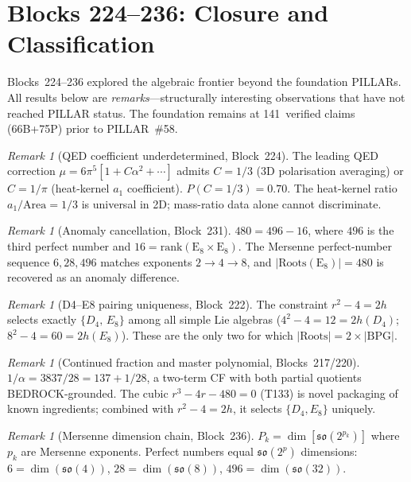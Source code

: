 \documentclass[aps,prd,twocolumn,superscriptaddress,floatfix,nofootinbib]{revtex4-2}
\theoremstyle{definition}
\theoremstyle{remark}
\newtheorem{remark}[theorem]{Remark}
\begin{document}
\section{Blocks 224--236: Closure and Classification}
\label{sec:closure}

Blocks~224--236 explored the algebraic frontier beyond the foundation
PILLARs.  All results below are \emph{remarks}---structurally interesting
observations that have not reached PILLAR status.  The foundation remains
at 141~verified claims (66B+75P) prior to PILLAR~\#58.

\begin{remark}[QED coefficient underdetermined, Block~224]
\label{rem:qed-coeff}
The leading QED correction $\mu = 6\pi^5[1+C\alpha^2+\cdots]$ admits
$C=1/3$ (3D polarisation averaging) or $C=1/\pi$ (heat-kernel $a_1$
coefficient).  $P(C{=}1/3)=0.70$.  The heat-kernel ratio $a_1/\mathrm{Area}=1/3$
is universal in 2D; mass-ratio data alone cannot discriminate.
\end{remark}

\begin{remark}[Anomaly cancellation, Block~231]
\label{rem:anomaly}
$480 = 496 - 16$, where $496$ is the third perfect number and
$16 = \mathrm{rank}(\mathrm{E}_8\times\mathrm{E}_8)$.  The Mersenne
perfect-number sequence $6,28,496$ matches exponents $2\to 4\to 8$,
and $|\mathrm{Roots}(\mathrm{E}_8)|=480$ is recovered as an anomaly difference.
\end{remark}

\begin{remark}[D4--E8 pairing uniqueness, Block~222]
\label{rem:d4e8}
The constraint $r^2-4=2h$ selects exactly $\{D_4,\,E_8\}$ among all simple
Lie algebras ($4^2{-}4=12=2h(D_4)$; $8^2{-}4=60=2h(E_8)$).  These are
the only two for which $|\mathrm{Roots}|=2\times|\mathrm{BPG}|$.
\end{remark}

\begin{remark}[Continued fraction and master polynomial, Blocks~217/220]
$1/\alpha = 3837/28 = 137 + 1/28$, a two-term CF with both partial quotients
BEDROCK-grounded.  The cubic $r^3-4r-480=0$ (T133) is novel packaging of known
ingredients; combined with $r^2-4=2h$, it selects $\{D_4,E_8\}$ uniquely.
\end{remark}

\begin{remark}[Mersenne dimension chain, Block~236]
\label{rem:mersenne}
$P_k = \dim[\mathfrak{so}(2^{p_k})]$ where $p_k$ are Mersenne exponents.
Perfect numbers equal $\mathfrak{so}(2^p)$ dimensions:
$6=\dim(\mathfrak{so}(4))$, $28=\dim(\mathfrak{so}(8))$,
$496=\dim(\mathfrak{so}(32))$.
\end{remark}
\end{document}
